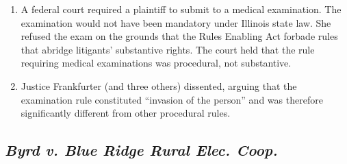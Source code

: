 \begin{enumerate}
    \item A federal court required a plaintiff to submit to a medical examination. The examination would not have been mandatory under Illinois state law. She refused the exam on the grounds that the Rules Enabling Act forbade rules that abridge litigants' substantive rights. The court held that the rule requiring medical examinations was procedural, not substantive.
    \item Justice Frankfurter (and three others) dissented, arguing that the examination rule constituted ``invasion of the person'' and was therefore significantly different from other procedural rules.
\end{enumerate}

\subsection{\emph{Byrd v. Blue Ridge Rural Elec. Coop.}}

